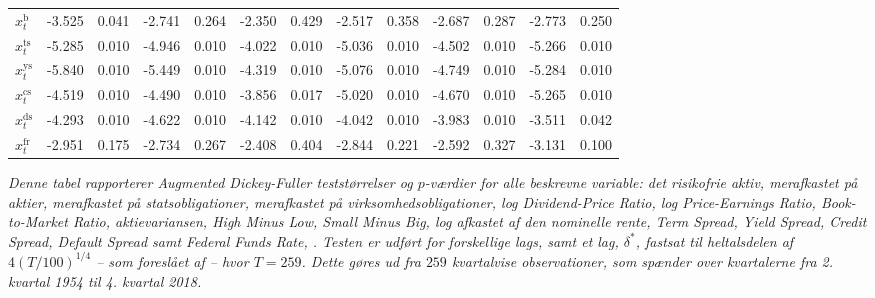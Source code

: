 \documentclass[
  a4paper,
  oneside]{memoir}
\begin{document}
\begin{table}[H]
{\begin{threeparttable}
\begin{tabular}[t]{lrrrrrrrrrrrr}
\rowcolor{gray!6}  $x_t^{\text{b}}$ & -3.525 & 0.041 & -2.741 & 0.264 & -2.350 & 0.429 & -2.517 & 0.358 & -2.687 & 0.287 & -2.773 & 0.250\\
$x_t^{\text{ts}}$ & -5.285 & 0.010 & -4.946 & 0.010 & -4.022 & 0.010 & -5.036 & 0.010 & -4.502 & 0.010 & -5.266 & 0.010\\
\rowcolor{gray!6}  $x_t^{\text{ys}}$ & -5.840 & 0.010 & -5.449 & 0.010 & -4.319 & 0.010 & -5.076 & 0.010 & -4.749 & 0.010 & -5.284 & 0.010\\
$x_t^{\text{cs}}$ & -4.519 & 0.010 & -4.490 & 0.010 & -3.856 & 0.017 & -5.020 & 0.010 & -4.670 & 0.010 & -5.265 & 0.010\\
\rowcolor{gray!6}  $x_t^{\text{ds}}$ & -4.293 & 0.010 & -4.622 & 0.010 & -4.142 & 0.010 & -4.042 & 0.010 & -3.983 & 0.010 & -3.511 & 0.042\\
$x_t^{\text{fr}}$ & -2.951 & 0.175 & -2.734 & 0.267 & -2.408 & 0.404 & -2.844 & 0.221 & -2.592 & 0.327 & -3.131 & 0.100\\
\bottomrule
\end{tabular}
\begin{tablenotes}
\item \textit{Denne tabel rapporterer Augmented Dickey-Fuller teststørrelser og $p$-værdier for alle beskrevne variable: det risikofrie aktiv, merafkastet på aktier, merafkastet på statsobligationer, merafkastet på virksomhedsobligationer, log Dividend-Price Ratio, log Price-Earnings Ratio, Book-to-Market Ratio, aktievariansen, High Minus Low, Small Minus Big, log afkastet af den nominelle rente, Term Spread, Yield Spread, Credit Spread, Default Spread samt Federal Funds Rate, \citep{Dickey1979}. Testen er udført for forskellige lags, samt et lag, $\delta^*$, fastsat til heltalsdelen af $4(T/100)^{1/4}$ -- som foreslået af \citep{Schwert1989} -- hvor $T=259$. Dette gøres ud fra $259$ kvartalvise observationer, som spænder over kvartalerne fra 2. kvartal 1954 til 4. kvartal 2018.}
\end{tablenotes}
\end{threeparttable}}
\end{table}
\end{document}
